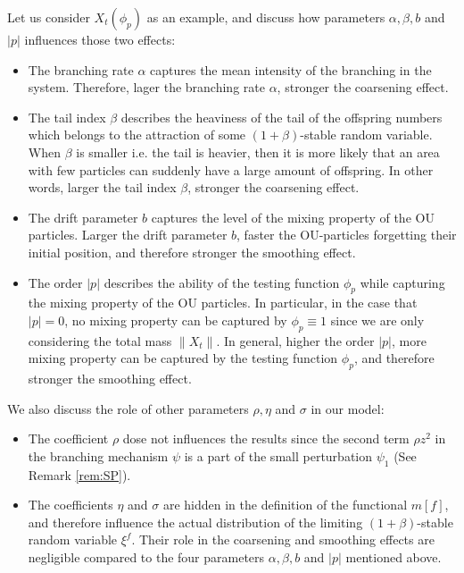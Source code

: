 \documentclass[12pt,a4paper]{amsart}
\theoremstyle{plain}
\theoremstyle{definition}
\numberwithin{equation}{section}
\begin{document}
Let us consider $X_t(\phi_p)$ as an example, and discuss how parameters $\alpha, \beta, b$ and $|p|$
influences those two effects:
\begin{itemize}
\item
  The branching rate $\alpha$ captures the mean intensity of the branching in the system. 
  Therefore, lager the branching rate $\alpha$, stronger the coarsening effect.
\item
  The tail index $\beta$ describes the heaviness of the tail of the offspring numbers which belongs to the attraction of some $(1+\beta)$-stable random variable. 
When $\beta$ is smaller i.e. the tail is heavier, then it is more likely that an area with few particles can suddenly have a large amount of offspring. 
In other words, larger the tail index $\beta$, stronger the coarsening effect. 
\item
  The drift parameter $b$ captures the level of the mixing property of the OU particles.
  Larger the drift parameter $b$, faster the OU-particles forgetting their initial position, and therefore stronger the smoothing effect.
\item
  The order $|p|$ describes the ability of the testing function $\phi_p$ while capturing the mixing property of the OU particles. 
  In particular, in the case that $|p| = 0$, no mixing property can be captured by $\phi_p \equiv 1$ since we are only considering the total mass $\|X_t\|$. 
  In general, higher the order $|p|$, more mixing property can be captured by the testing function $\phi_p$, and therefore stronger the smoothing effect.
\end{itemize} 
We also discuss the role of other parameters $\rho, \eta$ and $\sigma$ in our model:
\begin{itemize}
\item
  The coefficient $\rho$ dose not influences the results since the second term $\rho z^2$ in the branching mechanism $\psi$ is a part of the small perturbation $\psi_1$ (See Remark \ref{rem:SP}). 
\item
  The coefficients $\eta$ and $\sigma$ are hidden in the definition of the functional $m[f]$, and therefore influence the actual distribution of the limiting $(1+\beta)$-stable random variable $\xi^f$.
  Their role in the coarsening and smoothing effects are negligible compared to the four parameters $\alpha, \beta, b$ and $|p|$ mentioned above.
\end{itemize}


\end{document}
